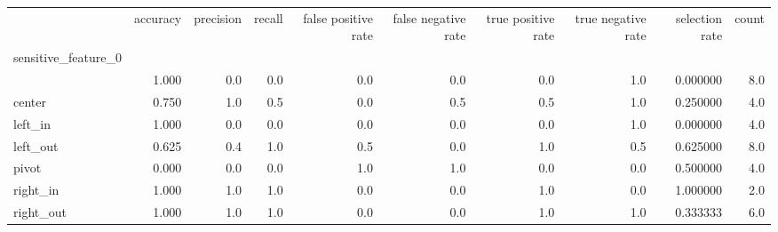 \begin{tabular}{lrrrrrrrrr}
\toprule
{} &  accuracy &  precision &  recall &  false positive rate &  false negative rate &  true positive rate &  true negative rate &  selection rate &  count \\
sensitive\_feature\_0 &           &            &         &                      &                      &                     &                     &                 &        \\
\midrule
                    &     1.000 &        0.0 &     0.0 &                  0.0 &                  0.0 &                 0.0 &                 1.0 &        0.000000 &    8.0 \\
center              &     0.750 &        1.0 &     0.5 &                  0.0 &                  0.5 &                 0.5 &                 1.0 &        0.250000 &    4.0 \\
left\_in             &     1.000 &        0.0 &     0.0 &                  0.0 &                  0.0 &                 0.0 &                 1.0 &        0.000000 &    4.0 \\
left\_out            &     0.625 &        0.4 &     1.0 &                  0.5 &                  0.0 &                 1.0 &                 0.5 &        0.625000 &    8.0 \\
pivot               &     0.000 &        0.0 &     0.0 &                  1.0 &                  1.0 &                 0.0 &                 0.0 &        0.500000 &    4.0 \\
right\_in            &     1.000 &        1.0 &     1.0 &                  0.0 &                  0.0 &                 1.0 &                 0.0 &        1.000000 &    2.0 \\
right\_out           &     1.000 &        1.0 &     1.0 &                  0.0 &                  0.0 &                 1.0 &                 1.0 &        0.333333 &    6.0 \\
\bottomrule
\end{tabular}
